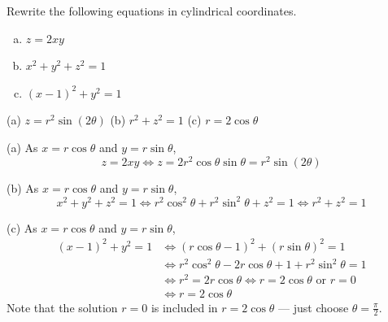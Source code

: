 \begin{question}
Rewrite the following equations in cylindrical coordinates.
\begin{enumerate}[(a)]
\item $z=2xy$
\item $x^2+y^2+z^2=1$
\item $(x-1)^2 + y^2 =1$
\end{enumerate}

\end{question}

%

\begin{answer}
(a) $z=r^2\sin(2\theta)$\qquad
(b) $r^2+z^2=1$\qquad
(c) $r=2\cos\theta$

\end{answer}

\begin{solution}
(a) As $x=r\cos\theta$ and $y=r\sin\theta$,
\begin{equation*}
z=2xy
\iff z=2r^2\cos\theta\sin\theta = r^2\sin(2\theta)
\end{equation*}

(b) As $x=r\cos\theta$ and $y=r\sin\theta$,
\begin{equation*}
x^2+y^2+z^2=1
\iff r^2\cos^2\theta+r^2\sin^2\theta + z^2 =1 
\iff r^2+z^2=1
\end{equation*}

(c) As $x=r\cos\theta$ and $y=r\sin\theta$,
\begin{align*}
(x-1)^2 + y^2 =1
&\iff (r\cos\theta-1)^2 + (r\sin\theta)^2 =1 \\
&\iff r^2\cos^2\theta -2r\cos\theta +1 + r^2\sin^2\theta = 1 \\
&\iff r^2=2r\cos\theta
\iff r=2\cos\theta\text{ or }r=0 \\
&\iff r=2\cos\theta
\end{align*}
Note that the solution $r=0$ is included in $r=2\cos\theta$ --- just choose $\theta=\frac{\pi}{2}$.

\end{solution}


\subsection*{\Procedural}

